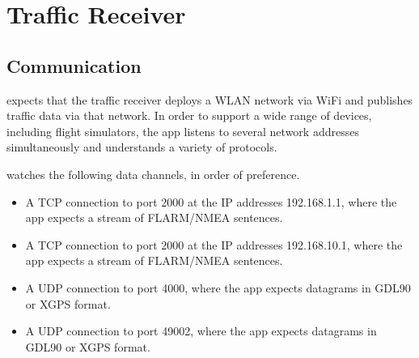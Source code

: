 \documentclass[letterpaper,10pt,english]{sphinxmanual}
\begin{document}
\section{Traffic Receiver}
\label{\detokenize{04-appendix/technical:traffic-receiver}}

\subsection{Communication}
\label{\detokenize{04-appendix/technical:communication}}
\sphinxAtStartPar
{} expects that the traffic receiver deploys a WLAN
network via Wi\sphinxhyphen{}Fi and publishes traffic data via that network.  In order to
support a wide range of devices, including flight simulators, the app listens to
several network addresses simultaneously and understands a variety of protocols.

\sphinxAtStartPar
{} watches the following data channels, in order of
preference.
\begin{itemize}
\item {} 
\sphinxAtStartPar
A TCP connection to port 2000 at the IP addresses 192.168.1.1, where the app
expects a stream of FLARM/NMEA sentences.

\item {} 
\sphinxAtStartPar
A TCP connection to port 2000 at the IP addresses 192.168.10.1, where the app
expects a stream of FLARM/NMEA sentences.

\item {} 
\sphinxAtStartPar
A UDP connection to port 4000, where the app expects datagrams in GDL90 or
XGPS format.

\item {} 
\sphinxAtStartPar
A UDP connection to port 49002, where the app expects datagrams in GDL90 or
XGPS format.

\end{itemize}
\end{document}
